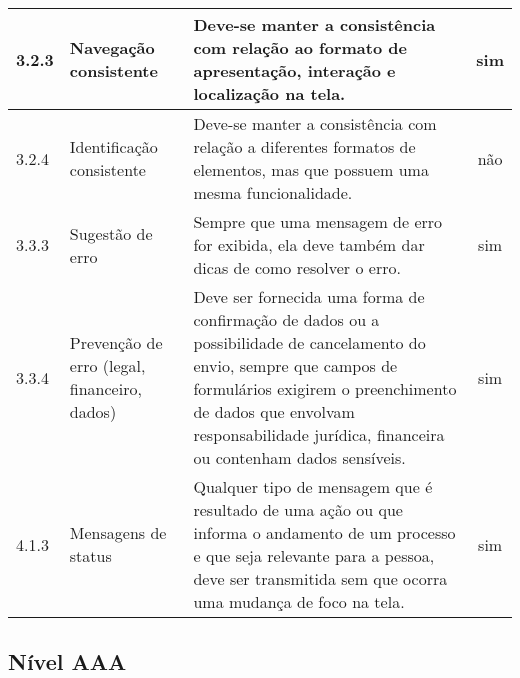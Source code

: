 \begin{appendices}
{\begin{minipage}{\linewidth}
{\begin{tabular}{|l|l|p{400px}|c|}
    3.2.3 &
        Navegação consistente & Deve-se manter a consistência com relação ao formato de apresentação, interação e localização na tela. & sim\\ \hline
    3.2.4 &
        Identificação consistente & Deve-se manter a consistência com relação a diferentes formatos de elementos, mas que possuem uma mesma funcionalidade. & não\\ \hline
    3.3.3  &
        Sugestão de erro & Sempre que uma mensagem de erro for exibida, ela deve também dar dicas de como resolver o erro. & sim\\ \hline
    3.3.4  &
        Prevenção de erro (legal, financeiro, dados) & Deve ser fornecida uma forma de confirmação de dados ou a possibilidade de cancelamento do envio, sempre que campos de formulários exigirem o preenchimento de dados que envolvam responsabilidade jurídica, financeira ou contenham dados sensíveis. & sim\\ \hline
    4.1.3  &
         Mensagens de status & Qualquer tipo de mensagem que é resultado de uma ação ou que informa o andamento de um processo e que seja relevante para a pessoa, deve ser transmitida sem que ocorra uma mudança de foco na tela. & sim\\ \hline

\end{tabular}
}
\label{Diretrizes nível AA}

\end{minipage}

}

\subsection{Nível AAA}
{

}
\end{appendices}
